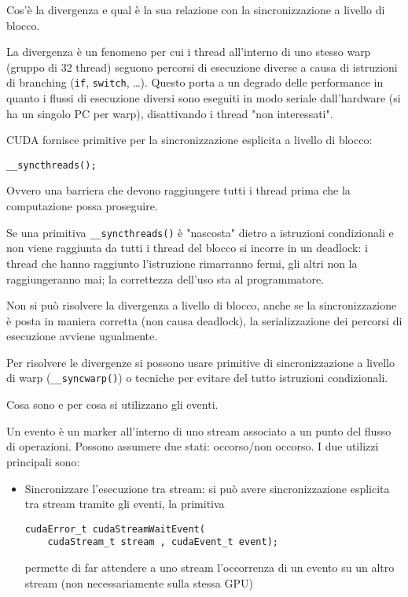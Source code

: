 \begin{questions}
    \question Cos'è la divergenza e qual è la sua relazione con la sincronizzazione a livello di blocco.
    
    \begin{solution}
        La divergenza è un fenomeno per cui i thread all'interno di uno stesso warp (gruppo di 32 thread) seguono percorsi di esecuzione diverse a causa di istruzioni di branching (\texttt{if}, \texttt{switch}, \dots). Questo porta a un degrado delle performance in quanto i flussi di esecuzione diversi sono eseguiti in modo seriale dall'hardware (si ha un singolo PC per warp), disattivando i thread "non interessati".
        
        CUDA fornisce primitive per la sincronizzazione esplicita a livello di blocco: 
        \begin{verbatim}
__syncthreads();
        \end{verbatim}
        Ovvero una barriera che devono raggiungere tutti i thread prima che la computazione possa proseguire.
        
        Se una primitiva \texttt{\_\_syncthreads()} è "nascosta" dietro a istruzioni condizionali e non viene raggiunta da tutti i thread del blocco si incorre in un deadlock: i thread che hanno raggiunto l'istruzione rimarranno fermi, gli altri non la raggiungeranno mai; la correttezza dell'uso sta al programmatore.
        
        Non si può risolvere la divergenza a livello di blocco, anche se la sincronizzazione è posta in maniera corretta (non causa deadlock), la serializzazione dei percorsi di esecuzione avviene ugualmente. 
        
        Per risolvere le divergenze si possono usare primitive di sincronizzazione a livello di warp (\texttt{\_\_syncwarp()}) o tecniche per evitare del tutto istruzioni condizionali.
    \end{solution}
    
    \question Cosa sono e per cosa si utilizzano gli eventi.
    
    \begin{solution}
        Un evento è un marker all'interno di uno stream associato a un punto del flusso di operazioni. Possono assumere due stati: occorso/non occorso. I due utilizzi principali sono: 
        \begin{itemize}
            \item Sincronizzare l'esecuzione tra stream: si può avere sincronizzazione esplicita tra stream tramite gli eventi, la primitiva
            \begin{verbatim}
cudaError_t cudaStreamWaitEvent(
    cudaStream_t stream , cudaEvent_t event);
            \end{verbatim}
            permette di far attendere a uno stream l'occorrenza di un evento su un altro stream (non necessariamente sulla stessa GPU)
            

\end{itemize}
\end{solution}
\end{questions}
